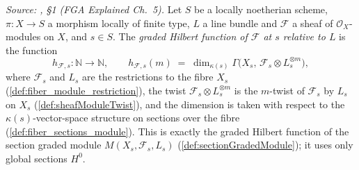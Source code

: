 \begin{definition}\leanok
  \label{def:fiber_hilbert_function}
  \textit{Source: \cite{nitsure-hilbert-quot}, \S 1 (FGA Explained Ch.~5).}
  Let \(S\) be a locally noetherian scheme, \(\pi : X \to S\) a morphism
  locally of finite type, \(L\) a line bundle and \(\mathcal{F}\) a sheaf of
  \(\mathcal{O}_X\)-modules on \(X\), and \(s \in S\). The \emph{graded
  Hilbert function of \(\mathcal{F}\) at \(s\) relative to \(L\)} is the
  function
  \[
    h_{\mathcal{F},s} : \mathbb{N} \longrightarrow \mathbb{N}, \qquad
    h_{\mathcal{F},s}(m) \;=\;
    \dim_{\kappa(s)} \Gamma\bigl(X_s,\, \mathcal{F}_s \otimes L_s^{\otimes m}\bigr),
  \]
  where \(\mathcal{F}_s\) and \(L_s\) are the restrictions to the fibre
  \(X_s\) (\cref{def:fiber_module_restriction}), the twist
  \(\mathcal{F}_s \otimes L_s^{\otimes m}\) is the \(m\)-twist of
  \(\mathcal{F}_s\) by \(L_s\) on \(X_s\) (\cref{def:sheafModuleTwist}), and
  the dimension is taken with respect to the \(\kappa(s)\)-vector-space
  structure on sections over the fibre (\cref{def:fiber_sections_module}).
  This is exactly the graded Hilbert function of the section graded module
  \(M(X_s, \mathcal{F}_s, L_s)\) (\cref{def:sectionGradedModule}); it uses
  only global sections \(H^0\).
\end{definition}

